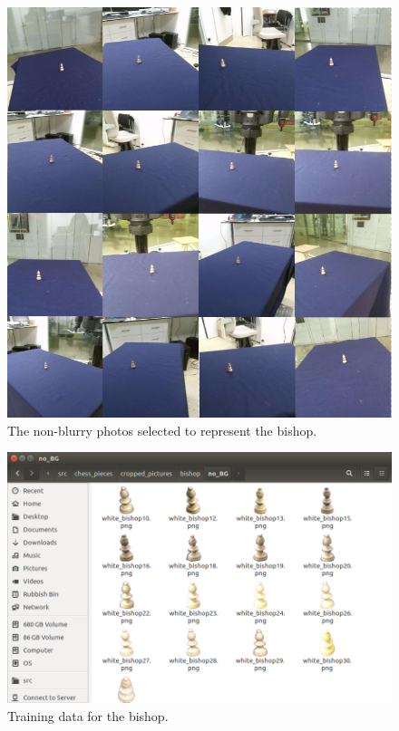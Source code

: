 \documentclass{l4proj}
\begin{document}
\begin{figure}[h!]
\centering
\includegraphics[scale=0.5]{first_pictures.png}
\caption{The non-blurry photos selected to represent the bishop.}
\label{BishopSetOfPictures}
\end{figure}



\begin{figure}[h!]
\centering
\includegraphics[scale=0.40]{bishop_folder_noBG.png}
\caption{Training data for the bishop.}
\label{BishopFolderNoBG}
\end{figure}
\end{document}
